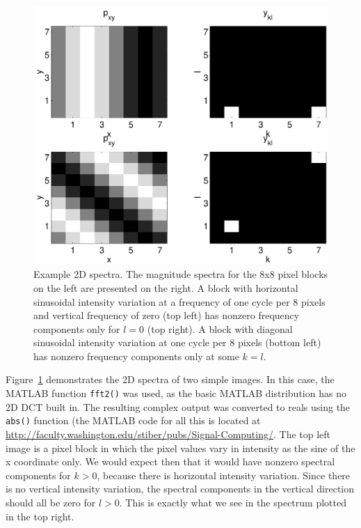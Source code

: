 \begin{enumerate}
\begin{figure}
\centerline{\includegraphics[width=\textwidth]{ch-av/dctdemo}}
\caption[Example 2D spectra]{Example 2D spectra. The magnitude
spectra for the 8x8 pixel blocks on the left are presented on the
right. A block with horizontal sinusoidal intensity variation at a
frequency of one cycle per 8 pixels and vertical frequency of zero
(top left) has nonzero frequency components only for $l=0$ (top
right). A block with diagonal sinusoidal intensity variation at one
cycle per 8 pixels (bottom left) has nonzero frequency components only
at some $k=l$.\label{fg:dctdemo}}
\end{figure}

Figure~\ref{fg:dctdemo} demonstrates the 2D spectra of two simple
images. In this case, the MATLAB function \verb|fft2()| was used, as
the basic MATLAB distribution has no 2D DCT built in. The resulting
complex output was converted to reals using the \verb|abs()| function
(the MATLAB code for all this is located at
\url{http://faculty.washington.edu/stiber/pubs/Signal-Computing/}. The top
left image is a pixel block in which the pixel values vary in
intensity as the sine of the x coordinate only.  We would expect then
that it would have nonzero spectral components for $k>0$, because
there is horizontal intensity variation.  Since there is no vertical
intensity variation, the spectral components in the vertical direction
should all be zero for $l>0$. This is exactly what we see in the
spectrum plotted in the top right.


\end{enumerate}
